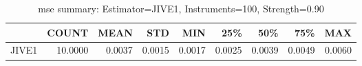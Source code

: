 \begin{table}[ht]
\centering
\caption{mse summary: Estimator=JIVE1, Instruments=100, Strength=0.90}
\begin{tabular}{lrrrrrrrr}
\toprule
 & COUNT & MEAN & STD & MIN & 25\% & 50\% & 75\% & MAX \\
\midrule
JIVE1 & 10.0000 & 0.0037 & 0.0015 & 0.0017 & 0.0025 & 0.0039 & 0.0049 & 0.0060 \\
\bottomrule
\end{tabular}
\end{table}
